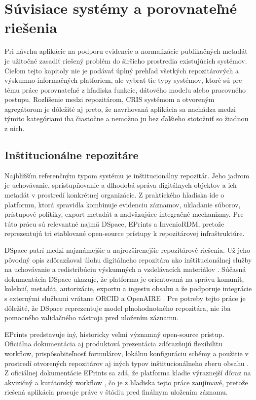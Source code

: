 

\section{Súvisiace systémy a porovnateľné riešenia}

Pri návrhu aplikácie na podporu evidencie a normalizácie publikačných metadát je užitočné zasadiť riešený problém do širšieho prostredia existujúcich systémov. Cieľom tejto kapitoly nie je podávať úplný prehľad všetkých repozitárových a výskumno-informačných platforiem, ale vybrať tie typy systémov, ktoré sú pre tému práce porovnateľné z hľadiska funkcie, dátového modelu alebo pracovného postupu. Rozlíšenie medzi repozitárom, CRIS systémom a otvoreným agregátorom je dôležité aj preto, že navrhovaná aplikácia sa nachádza medzi týmito kategóriami iba čiastočne a nemožno ju bez ďalšieho stotožniť so žiadnou z nich.

\subsection{Inštitucionálne repozitáre}

Najbližším referenčným typom systému je inštitucionálny repozitár. Jeho jadrom je uchovávanie, sprístupňovanie a dlhodobá správa digitálnych objektov a ich metadát v prostredí konkrétnej organizácie. Z praktického hľadiska ide o platformu, ktorá spravidla kombinuje evidenciu záznamov, ukladanie súborov, prístupové politiky, export metadát a nadväzujúce integračné mechanizmy. Pre túto prácu sú relevantné najmä DSpace, EPrints a InvenioRDM, pretože reprezentujú tri etablované open-source prístupy k repozitárovej infraštruktúre.

DSpace patrí medzi najznámejšie a najrozšírenejšie repozitárové riešenia. Už jeho pôvodný opis zdôrazňoval úlohu digitálneho repozitára ako inštitucionálnej služby na uchovávanie a redistribúciu výskumných a vzdelávacích materiálov \cite{Smith2003}. Súčasná dokumentácia DSpace ukazuje, že platforma je orientovaná na správu komunít, kolekcií, metadát, autorizácie, exportu a ingestu obsahu a že podporuje integrácie s externými službami vrátane ORCID a OpenAIRE \cite{DSpaceDocs}. Pre potreby tejto práce je dôležité, že DSpace reprezentuje model plnohodnotného repozitára, nie iba pomocného validačného nástroja pred uložením záznamu.

EPrints predstavuje iný, historicky veľmi významný open-source prístup. Oficiálna dokumentácia aj produktová prezentácia zdôrazňujú flexibilitu workflow, prispôsobiteľnosť formulárov, lokálnu konfiguráciu schémy a použitie v prostredí otvorených repozitárov aj iných typov inštitucionálneho zberu obsahu \cite{EPrintsWhatIs}. Z oficiálnej dokumentácie EPrints sa zdá, že platforma kladie výraznejší dôraz na akvizičný a kurátorský workflow \cite{EPrintsWhatIs}, čo je z hľadiska tejto práce zaujímavé, pretože riešená aplikácia pracuje práve v štádiu pred finálnym uložením záznamu.

